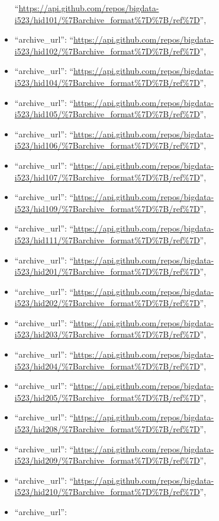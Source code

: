 \begin{itemize}
  ``\url{https://api.github.com/repos/bigdata-i523/hid101/\%7Barchive_format\%7D\%7B/ref\%7D}'',
\item
  ``archive\_url'':
  ``\url{https://api.github.com/repos/bigdata-i523/hid102/\%7Barchive_format\%7D\%7B/ref\%7D}'',
\item
  ``archive\_url'':
  ``\url{https://api.github.com/repos/bigdata-i523/hid104/\%7Barchive_format\%7D\%7B/ref\%7D}'',
\item
  ``archive\_url'':
  ``\url{https://api.github.com/repos/bigdata-i523/hid105/\%7Barchive_format\%7D\%7B/ref\%7D}'',
\item
  ``archive\_url'':
  ``\url{https://api.github.com/repos/bigdata-i523/hid106/\%7Barchive_format\%7D\%7B/ref\%7D}'',
\item
  ``archive\_url'':
  ``\url{https://api.github.com/repos/bigdata-i523/hid107/\%7Barchive_format\%7D\%7B/ref\%7D}'',
\item
  ``archive\_url'':
  ``\url{https://api.github.com/repos/bigdata-i523/hid109/\%7Barchive_format\%7D\%7B/ref\%7D}'',
\item
  ``archive\_url'':
  ``\url{https://api.github.com/repos/bigdata-i523/hid111/\%7Barchive_format\%7D\%7B/ref\%7D}'',
\item
  ``archive\_url'':
  ``\url{https://api.github.com/repos/bigdata-i523/hid201/\%7Barchive_format\%7D\%7B/ref\%7D}'',
\item
  ``archive\_url'':
  ``\url{https://api.github.com/repos/bigdata-i523/hid202/\%7Barchive_format\%7D\%7B/ref\%7D}'',
\item
  ``archive\_url'':
  ``\url{https://api.github.com/repos/bigdata-i523/hid203/\%7Barchive_format\%7D\%7B/ref\%7D}'',
\item
  ``archive\_url'':
  ``\url{https://api.github.com/repos/bigdata-i523/hid204/\%7Barchive_format\%7D\%7B/ref\%7D}'',
\item
  ``archive\_url'':
  ``\url{https://api.github.com/repos/bigdata-i523/hid205/\%7Barchive_format\%7D\%7B/ref\%7D}'',
\item
  ``archive\_url'':
  ``\url{https://api.github.com/repos/bigdata-i523/hid208/\%7Barchive_format\%7D\%7B/ref\%7D}'',
\item
  ``archive\_url'':
  ``\url{https://api.github.com/repos/bigdata-i523/hid209/\%7Barchive_format\%7D\%7B/ref\%7D}'',
\item
  ``archive\_url'':
  ``\url{https://api.github.com/repos/bigdata-i523/hid210/\%7Barchive_format\%7D\%7B/ref\%7D}'',
\item
  ``archive\_url'':

\end{itemize}
